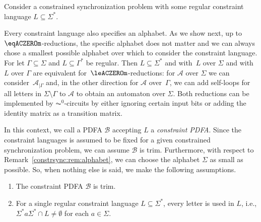 
Consider a constrained synchronization problem 
with some regular constraint language $L \subseteq \Sigma^*$.

\begin{remark}
	\label{constrsync:rem:alphabet}	
	Every constraint language also specifies an alphabet.
	As we show next, up to $\eqACZEROm$-reductions,
	the specific alphabet does not matter and we can always
	chose a smallest possible alphabet over which to consider the constraint
	language.
	For let $\Gamma \subseteq \Sigma$ and $L \subseteq \Gamma^*$ be regular.
	Then $L \subseteq \Sigma^*$
	and  with~$L$ over $\Sigma$
	and  with~$L$ over $\Gamma$
	are equivalent for~$\leACZEROm$-reductions:
	for $\mathcal A$ over $\Sigma$
	we can consider~$\mathcal A_{|\Gamma}$
	and, in the other direction for $\mathcal A$ over~$\Gamma$,
	we can add self-loops for all letters in $\Sigma \setminus \Gamma$ 
	to $\mathcal A$ to obtain an automaton over $\Sigma$.
	Both reductions can be implemented by $\AC^0$-circuits
	by either ignoring certain input bits
	or adding the identity matrix as a transition matrix.
\end{remark}

In this context, we call a PDFA $\mathcal B$ accepting $L$
a \emph{constraint PDFA}.
Since the constraint languages is assumed to be fixed for a given constrained synchronization 
problem, we can assume $\mathcal B$ is trim.
Furthermore, with respect to Remark~\ref{constrsync:rem:alphabet},
we can choose the alphabet $\Sigma$ 
as small as possible.
So, when nothing else is said, we make the following assumptions.

\begin{enumerate}
	\item The constraint PDFA $\mathcal B$ is trim.
	
	\item For a single regular constraint language $L \subseteq \Sigma^*$,
	every letter is used in $L$, i.e.,
	$\Sigma^* a \Sigma^* \cap L \ne \emptyset$
	for each $a \in \Sigma$.
	
\end{enumerate}

